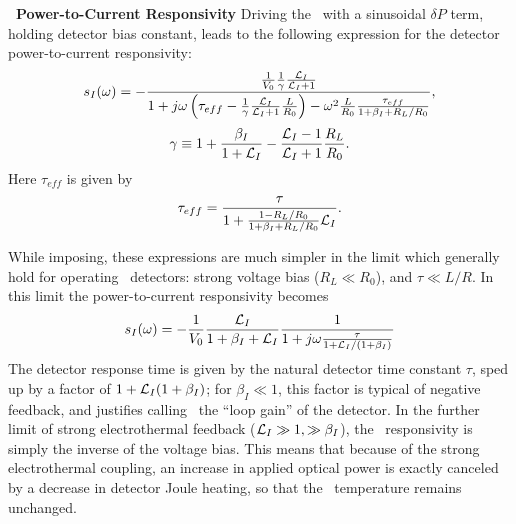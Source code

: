 \textbf{\TES\ Power-to-Current Responsivity}
Driving the \TES\ with a sinusoidal $\delta P$ term, holding detector bias constant, leads to the following expression for the detector power-to-current responsivity:
\begin{equation}\label{eqn:si-full}
s_I(\omega) = 
- \frac{ \frac{1}{V_0} \frac{1}{\gamma} \frac{\mathcal{L}_I}{\mathcal{L}_I + 1} }
       { 1 + j \omega \left( \tau_{eff} - \frac{1}{\gamma}\frac{\mathcal{L}_I}{\mathcal{L}_I + 1} \frac{L}{R_0}\right) - \omega^2 \frac{L}{R_0}\frac{\tau_{eff}}{1 + \beta_I + R_L / R_0}},
\end{equation}
\begin{equation}
\gamma \equiv 1 + \frac{\beta_I}{1+\mathcal{L}_I} - \frac{\mathcal{L}_I - 1}{\mathcal{L}_I + 1}\frac{R_L}{R_0}.
\end{equation}
Here $\tau_{eff}$ is given by
\begin{equation} \label{eqn:teff}
  \tau_{eff} = \frac{\tau}{1 + \frac{1 - R_L / R_0}{1 + \beta_I + R_L / R_0} \mathcal{L}_I}.
\end{equation}

While imposing, these expressions are much simpler in the limit which generally hold for operating \TES\ detectors: strong voltage bias ($R_L \ll R_0$), and $\tau \ll L/R$. 
In this limit the power-to-current responsivity becomes
\begin{equation}
s_I(\omega) = -\frac{1}{V_0} \frac{\mathcal{L}_I}{1+\beta_I + \mathcal{L}_I} \frac{1}{1 + j \omega \frac{\tau}{1 +\mathcal{L}_I/(1+\beta_I)}}
\end{equation}
The detector response time is given by the natural detector time constant $\tau$, sped up by a factor of $1 + \mathcal{L}_I(1+\beta_I)$; for $\beta_I \ll 1$, this factor is typical of negative feedback, and justifies calling \Loop\ the ``loop gain'' of the detector.
In the further limit of strong electrothermal feedback ($\mathcal{L}_I \gg 1, \gg \beta_I$), the \DC\ responsivity is simply the inverse of the voltage bias.
This means that because of the strong electrothermal coupling, an increase in applied optical power is exactly canceled by a decrease in detector Joule heating, so that the \TES\ temperature remains unchanged.

